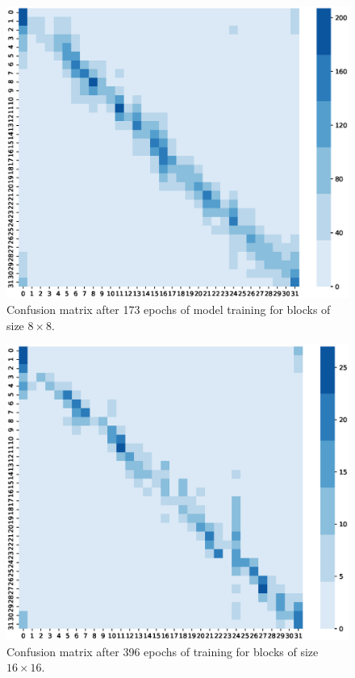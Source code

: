 \begin{figure}
    \centering
    \includegraphics[width=\textwidth,height=\textheight,keepaspectratio]{Figures/confusion-matrix/08-kpt-133049.eps}
    \caption[Confusion matrix after 173 epochs of model training for blocks of size \(8\times8\)]
    {Confusion matrix after 173 epochs of model training for blocks of size \(8\times8\).}\label{fig:cm8times8}
\end{figure}

\begin{figure}
    \centering
    \includegraphics[width=\textwidth,height=\textheight,keepaspectratio]{Figures/confusion-matrix/16-kpt-304857.eps}
    \caption[Confusion matrix after 396 epochs of training for blocks of size \(16\times16\)]
    {Confusion matrix after 396 epochs of training for blocks of size \(16\times16\).}\label{fig:cm16times16}
\end{figure}

